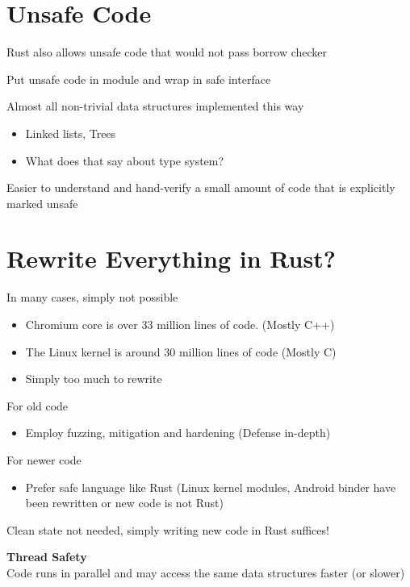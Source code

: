 \documentclass[11pt]{article}
\begin{document}
\section*{Unsafe Code}

Rust also allows unsafe code that would not pass borrow checker

Put unsafe code in module and wrap in safe interface

Almost all non-trivial data structures implemented this way
\begin{itemize}
	\item Linked lists, Trees
	\item What does that say about type system?
\end{itemize}

Easier to understand and hand-verify a small amount of code that is explicitly marked unsafe

\section*{Rewrite Everything in Rust?}
In many cases, simply not possible
\begin{itemize}
	\item Chromium core is over 33 million lines of code. (Mostly C++)
	\item The Linux kernel is around 30 million lines of code (Mostly C)
	\item Simply too much to rewrite
\end{itemize}

For old code
\begin{itemize}
	\item Employ fuzzing, mitigation and hardening (Defense in-depth)
\end{itemize}

For newer code
\begin{itemize}
	\item Prefer safe language like Rust (Linux kernel modules, Android binder have been rewritten or new code is not Rust)
\end{itemize}
Clean state not needed, simply writing new code in Rust suffices!

\vspace{0.5cm}
\begin{center}
  {\LARGE \textbf{Thread Safety}} \\
  Code runs in parallel and may access the same data structures faster (or slower)
\end{center}
\end{document}
